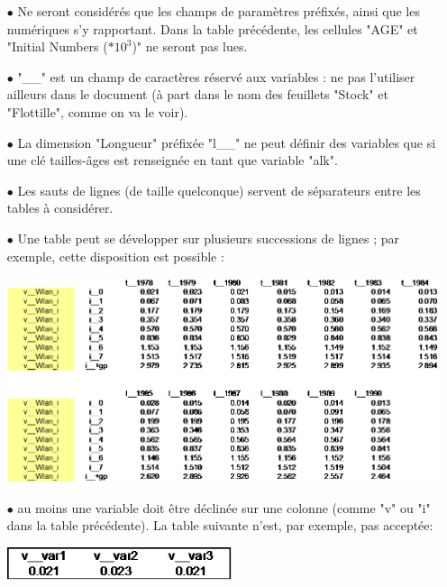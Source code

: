 \documentclass[12pt, colorinlistoftodos]{article}
\newenvironment{not used}[1]{%
    \longtable{%
        |>{\centering$\displaystyle}A{#1}{1}<{$}%
        |}\hline\ignorespaces}{%
    \endlongtable\ignorespacesafterend}
\begin{document}
\begin{itemize}
    \item[$\bullet$] Ne seront considérés que les champs de paramètres préfixés, ainsi que les numériques s'y rapportant. Dans la table précédente, les cellules "AGE" et "Initial Numbers ($*10^3$)" ne seront pas lues. 
    \item[$\bullet$] "\_\_" est un champ de caractères réservé aux variables : ne pas l'utiliser ailleurs dans le document (à part dans le nom des feuillets "Stock" et "Flottille", comme on va le voir).
    \item[$\bullet$] La dimension "Longueur" préfixée "l\_\_" ne peut définir des variables que si une clé tailles-âges est renseignée en tant que variable "alk".
    \item[$\bullet$] Les sauts de lignes (de taille quelconque) servent de séparateurs entre les tables à considérer.
    \item[$\bullet$] Une table peut se développer sur plusieurs successions de lignes ; par exemple, cette disposition est possible :
    
    \begin{minipage}{\linewidth}
        \centering
        \includegraphics[width = \textwidth]{figures/param/stock5.png}
    \end{minipage}
    \vspace{12pt}

    \item[$\bullet$] au moins une variable doit être déclinée sur une colonne (comme "v" ou "i" dans la table précédente). La table suivante n'est, par exemple,  pas acceptée:
    
    \begin{minipage}{\linewidth}
        \centering
        \includegraphics[width = 6.6cm]{figures/param/stock6.png}
    \end{minipage}
    \vspace{12pt}


\end{itemize}
\end{document}
